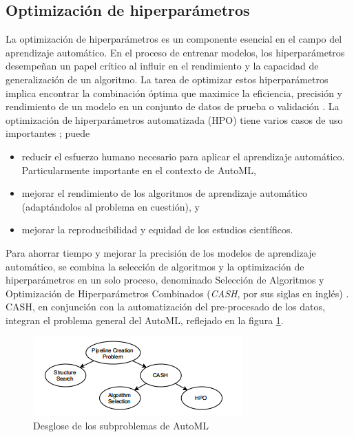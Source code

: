 \subsection{Optimización de hiperparámetros}
La optimización de hiperparámetros es un componente esencial en el campo del aprendizaje automático. En el proceso de entrenar modelos, los hiperparámetros desempeñan un papel crítico al influir en el rendimiento y la capacidad de generalización de un algoritmo. La tarea de optimizar estos hiperparámetros implica encontrar la combinación óptima que maximice la eficiencia, precisión y rendimiento de un modelo en un conjunto de datos de prueba o validación  \citep{hastie2009elements}. La optimización de hiperparámetros automatizada (HPO) tiene varios casos de uso importantes  \citep{hutter2019automated}; puede
\begin{itemize}
	\item reducir el esfuerzo humano necesario para aplicar el aprendizaje automático. Particularmente importante en el contexto de AutoML,
	\item mejorar el rendimiento de los algoritmos de aprendizaje automático (adaptándolos al problema en cuestión), y
	\item mejorar la reproducibilidad y equidad de los estudios científicos.
\end{itemize}
Para ahorrar tiempo y mejorar la precisión de los modelos de aprendizaje automático, se combina la selección de algoritmos y la optimización de hiperparámetros en un solo proceso, denominado Selección de Algoritmos y Optimización de Hiperparámetros Combinados (\textit{CASH}, por sus siglas en inglés) \citep{tuggener2019automated}. \\
CASH, en conjunción con la automatización del pre-procesado de los datos, integran el problema general del AutoML, reflejado en la figura \ref{fig:desglose-de-los-subproblemas-de-automl}. 
\begin{figure}[H]
	\centering
	\includegraphics[width=0.6\linewidth]{"figuras/capi 1/Desglose de los subproblemas de AutoML"}
	\caption{Desglose de los subproblemas de AutoML \citep{zoller2021benchmark}}
	\label{fig:desglose-de-los-subproblemas-de-automl}
\end{figure} 
